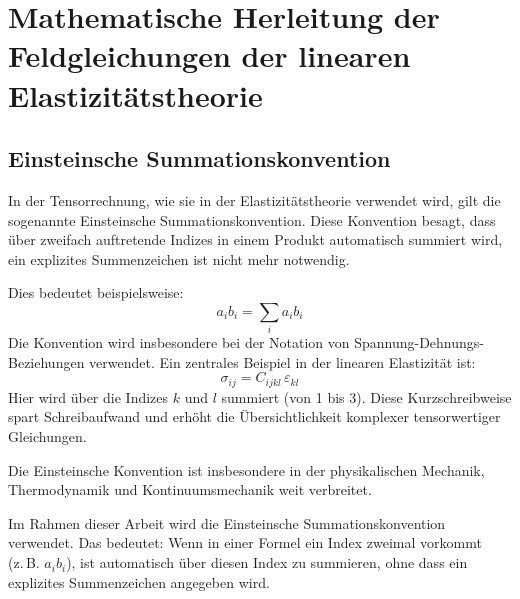 %
%
%
%
\section{Mathematische Herleitung der Feldgleichungen der linearen Elastizitätstheorie}
\label{elastomechanik:section:herleitung2}
\subsection{Einsteinsche Summationskonvention}
In der Tensorrechnung, wie sie in der Elastizitätstheorie verwendet wird, gilt die sogenannte Einsteinsche Summationskonvention. 
Diese Konvention besagt, dass über zweifach auftretende Indizes in einem Produkt automatisch summiert wird, ein explizites Summenzeichen ist nicht mehr notwendig.

Dies bedeutet beispielsweise:
	\begin{equation}
		a_i b_i = 
		\sum_i a_i b_i
	\end{equation}
Die Konvention wird insbesondere bei der Notation von Spannung-Dehnungs-Beziehungen verwendet. Ein zentrales Beispiel in der linearen Elastizität ist:
	\begin{equation}
		\sigma_{ij} = 
		C_{ijkl} \, \varepsilon_{kl}	
	\end{equation}
Hier wird über die Indizes $k$ und $l$ summiert (von 1 bis 3). 
Diese Kurzschreibweise spart Schreibaufwand und erhöht die Übersichtlichkeit komplexer tensorwertiger Gleichungen.

Die Einsteinsche Konvention ist insbesondere in der physikalischen Mechanik, Thermodynamik und Kontinuumsmechanik weit verbreitet.

Im Rahmen dieser Arbeit wird die Einsteinsche Summationskonvention verwendet. 
Das bedeutet: Wenn in einer Formel ein Index zweimal vorkommt (z. B. $a_ib_i$), ist automatisch über diesen Index zu summieren, ohne dass ein explizites Summenzeichen angegeben wird.
